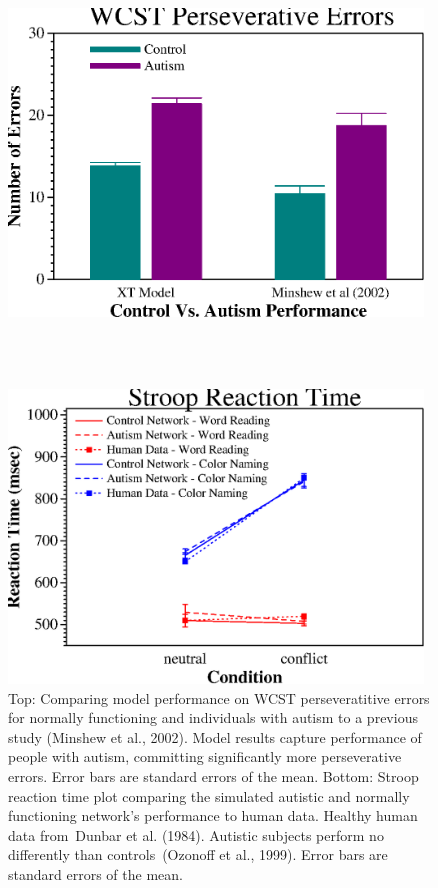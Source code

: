 \begin{figure}
\begin{center}
	\includegraphics[width=110mm]{graphs/wcst.ps}
                                                                
\textcolor{white}{\\--------------------------------\\}

	\includegraphics[width=110mm]{graphs/stroop.ps}
\end{center}
\caption{Top: Comparing model performance on WCST perseveratitive errors for normally functioning and individuals with autism to a previous study (Minshew et al., 2002). Model results capture performance of people with autism, committing significantly more perseverative errors. Error bars are standard errors of the mean.  Bottom: Stroop reaction time plot comparing the simulated autistic and normally functioning network's performance to human data. Healthy human data from~Dunbar et al. (1984).  Autistic subjects perform no differently than controls~(Ozonoff et al., 1999).  Error bars are standard errors of the mean.} 
\label{wcst-figure}
\end{figure} 

